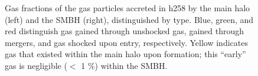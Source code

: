 \documentclass[manuscript]{aastex}
\begin{document}
\begin{figure}
\centerline{}
\caption[]{Gas fractions of the gas particles accreted in h258 by the main halo (left) and the SMBH (right), distinguished by type. Blue, green, and red distinguish gas gained through unshocked gas, gained through mergers, and gas shocked upon entry, respectively. Yellow indicates gas that existed within the main halo upon formation; this ``early'' gas is negligible ($<$ 1 $\%$) within the SMBH.}
\label{h258stackfrac} 
\end{figure}
\end{document}
